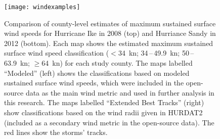 \documentclass[11pt, titlepage, twoside]{article}
\begin{document}
\clearpage 

\begin{figure}[tbhp!]
\centering
\texttt{[image: windexamples]}
\caption{Comparison of county-level estimates of maximum sustained surface wind speeds
	for Hurricane Ike in 2008 (top) and Hurriance Sandy in 2012 (bottom). 
	Each map shows the estimated maximum sustained surface wind speed 
	classification ($<$34~\si{\knot}; 34\,--\,49.9~\si{\knot}; 
	50\,--\,63.9~\si{\knot}; $\ge$64~\si{\knot}) for each study county. 
	The maps labelled ``Modeled'' (left)
	shows the classifications based on modeled sustained surface wind
	speeds, which were included in the open-source data as the main 
	wind metric and used in further analysis in this research. The maps
	labelled ``Extended Best Tracks'' (right) show classifications based on the 
	wind radii given in \ac{HURDAT2} (included as a secondary wind 
	metric in the open-source data). The red lines show the storms' 
	tracks.
	}
\label{fig:windexamples}
\end{figure}


\clearpage

\printbibliography
\end{document}
